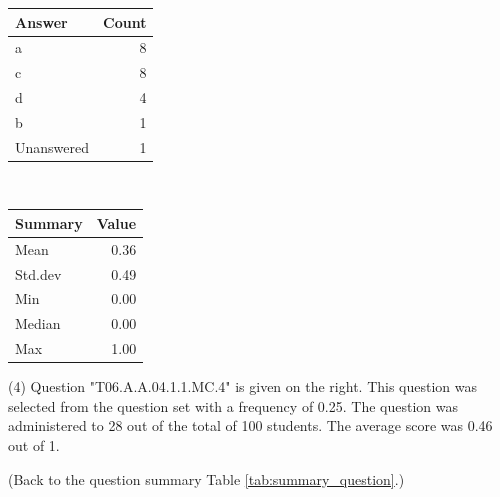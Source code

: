 \documentclass[12pt,nohyper]{tufte-handout}\usepackage[]{graphicx}\usepackage[]{color}
\begin{document}
\begin{center}%
\begin{tabular}{lr}
  \hline
Answer & Count \\ 
  \hline
a &   8 \\ 
  c &   8 \\ 
  d &   4 \\ 
  b &   1 \\ 
  Unanswered &   1 \\ 
   \hline
\end{tabular}
~~~~~~~~%
\begin{tabular}{lr}
  \hline
Summary & Value \\ 
  \hline
Mean & 0.36 \\ 
  Std.dev & 0.49 \\ 
  Min & 0.00 \\ 
  Median & 0.00 \\ 
  Max & 1.00 \\ 
   \hline
\end{tabular}
\end{center}\newpage{} (4) Question "T06.A.A.04.1.1.MC.4" is given on the right. This question was selected from the question set with a frequency of 0.25. The question was administered to 28 out of the total of 100 students. The average score was 0.46 out of 1.

 (Back to the question summary Table \ref{tab:summary_question}.)
\end{document}
